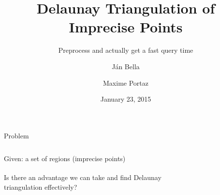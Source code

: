 \documentclass{beamer}
\author{J\'an Bella \and Maxime Portaz}
\title{Delaunay Triangulation of Imprecise Points}
\subtitle{Preprocess and actually get a fast query time}
\institute{Grenoble INP}
\date{January 23, 2015}
\begin{document}



\frame{\titlepage}
\begin{frame}{Problem}
\begin{columns}
Given: 
a set of regions (imprecise points)\\
\pause
~\\
Is there an advantage we can take and find Delaunay triangulation effectively?
\begin{figure}
		\centering
\hspace*{-0.5cm}		
	\end{figure}


\end{columns}
\end{frame}
\end{document}
